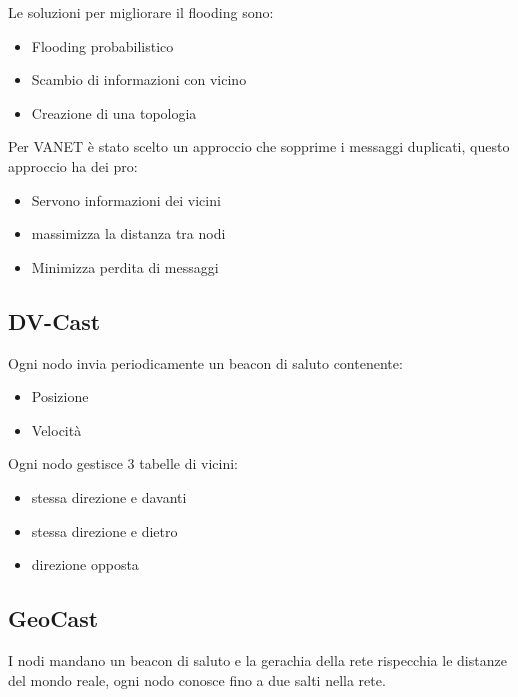Le soluzioni per migliorare il flooding sono:
\begin{itemize}
	\item Flooding probabilistico
	\item Scambio di informazioni con vicino
	\item Creazione di una topologia
\end{itemize}


Per VANET \`e stato scelto un approccio che sopprime i messaggi duplicati, questo approccio
ha dei pro:
\begin{itemize}
	\item Servono informazioni dei vicini
	\item massimizza la distanza tra nodi
	\item Minimizza perdita di messaggi
\end{itemize}




\subsection{DV-Cast}

Ogni nodo invia periodicamente un beacon di saluto contenente:
\begin{itemize}
	\item Posizione
	\item Velocità
\end{itemize}

Ogni nodo gestisce 3 tabelle di vicini:
\begin{itemize}
	\item stessa direzione e davanti
	\item stessa direzione e dietro
	\item direzione opposta
\end{itemize}

\subsection{GeoCast}

I nodi mandano un beacon di saluto e la gerachia della rete rispecchia le distanze del mondo reale,
ogni nodo conosce fino a due salti nella rete.


